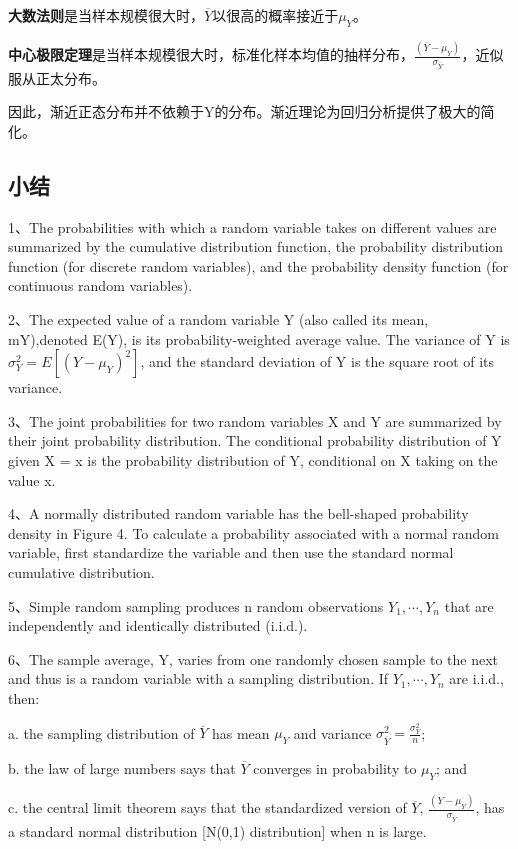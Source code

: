 \documentclass[cn,10pt,math=newtx,citestyle=gb7714-2015,bibstyle=gb7714-2015]{elegantbook}
\begin{document}
	\textbf{大数法则}是当样本规模很大时，$\overline{Y}$以很高的概率接近于$\mu_Y$。
	
	\textbf{中心极限定理}是当样本规模很大时，标准化样本均值的抽样分布，$\frac{(\overline{Y}-\mu_Y)}{\sigma_{\overline{Y}}}$，近似服从正太分布。
	
	因此，渐近正态分布并不依赖于Y的分布。渐近理论为回归分析提供了极大的简化。
	
	\subsection{小结}
	1、The probabilities with which a random variable takes on different values are summarized by the cumulative distribution function, the probability distribution function (for discrete random variables), and the probability density function (for continuous random variables).
	
	2、The expected value of a random variable Y (also called its mean, mY),denoted E(Y), is its probability-weighted average value. The variance of Y
	is $\sigma_Y^2=E[(Y-\mu_Y)^2]$, and the standard deviation of Y is the square root of its variance.
	
	3、The joint probabilities for two random variables X and Y are summarized by their joint probability distribution. The conditional probability distribution of Y given X = x is the probability distribution of Y, conditional on X taking on the value x.
	
	4、A normally distributed random variable has the bell-shaped probability density in Figure 4. To calculate a probability associated with a normal random variable, first standardize the variable and then use the standard normal cumulative distribution.
	
	5、Simple random sampling produces n random observations $Y_1,\cdots,Y_n$ that are independently and identically distributed (i.i.d.).
	
	6、The sample average, Y, varies from one randomly chosen sample to the next
	and thus is a random variable with a sampling distribution. If $Y_1,\cdots,Y_n$ are
	i.i.d., then:
	
	a. the sampling distribution of $\overline{Y}$ has mean $\mu_Y$ and variance $\sigma_{\overline{Y}}^2=\frac{\sigma_{Y}^2}{n}$;
	
	b. the law of large numbers says that $\overline{Y}$ converges in probability to $\mu_Y$; and
	
	c. the central limit theorem says that the standardized version of $\overline{Y}$,
	$\frac{(Y-\mu_Y)}{\sigma_{\overline{Y}}}$, has a standard normal distribution [N(0,1) distribution] when n is large.
	
\end{document}

